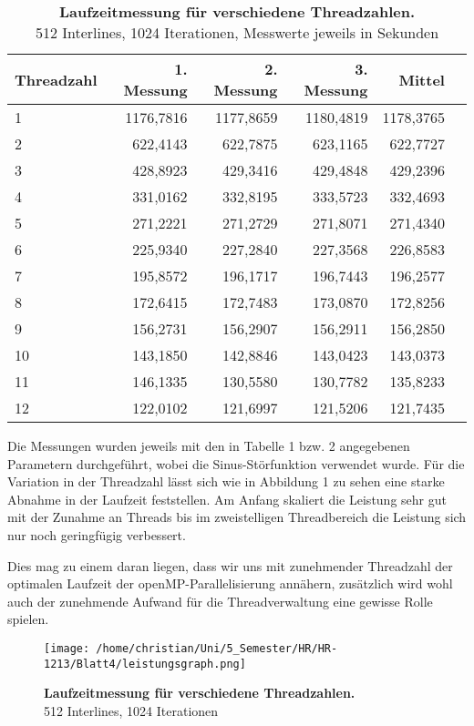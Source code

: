 \documentclass[a4paper,12pt]{scrartcl}
\begin{document}
\begin{table}[!h]
\begin{tabular}{|l|r|r|r|r|r|}
\hline
Threadzahl&1. Messung&2. Messung&3. Messung&Mittel\\
\hline
1	&1176,7816	&1177,8659	&1180,4819	&1178,3765\\
\hline
2	&622,4143	&622,7875	&623,1165	&622,7727\\
\hline
3	&428,8923	&429,3416	&429,4848	&429,2396\\
\hline
4	&331,0162	&332,8195	&333,5723	&332,4693\\
\hline
5	&271,2221	&271,2729	&271,8071	&271,4340\\
\hline
6	&225,9340	&227,2840	&227,3568	&226,8583\\
\hline
7	&195,8572	&196,1717	&196,7443	&196,2577\\
\hline
8	&172,6415	&172,7483	&173,0870	&172,8256\\
\hline
9	&156,2731	&156,2907	&156,2911	&156,2850\\
\hline
10	&143,1850	&142,8846	&143,0423	&143,0373\\
\hline
11	&146,1335	&130,5580	&130,7782	&135,8233\\
\hline
12	&122,0102	&121,6997	&121,5206	&121,7435\\

\hline
\end{tabular}
\caption{\textbf{Laufzeitmessung für verschiedene Threadzahlen.} \\512 Interlines, 1024 Iterationen, Messwerte jeweils in Sekunden}
\end{table}

Die Messungen wurden jeweils mit den in Tabelle 1 bzw. 2 angegebenen Parametern durchgeführt, wobei die Sinus-Störfunktion verwendet wurde. Für die Variation in der Threadzahl lässt sich wie in Abbildung 1 zu sehen eine starke Abnahme in der Laufzeit feststellen. Am Anfang skaliert die Leistung sehr gut mit der Zunahme an Threads bis im zweistelligen Threadbereich die Leistung sich nur noch geringfügig verbessert. 

Dies mag zu einem daran liegen, dass wir uns mit zunehmender Threadzahl der optimalen Laufzeit der openMP-Parallelisierung annähern, zusätzlich wird wohl auch der zunehmende Aufwand für die Threadverwaltung eine gewisse Rolle spielen.
\begin{figure}[!ht]
\texttt{[image: /home/christian/Uni/5\_Semester/HR/HR-1213/Blatt4/leistungsgraph.png]}
\caption{\textbf{Laufzeitmessung für verschiedene Threadzahlen.} \\512 Interlines, 1024 Iterationen}
\end{figure}
\end{document}
